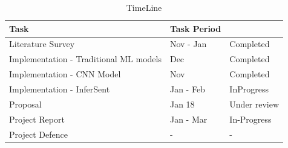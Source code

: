 \documentclass[12pt]{report} %
\begin{document}
	\begin{table}[ht]
		\centering
		\caption{TimeLine}
		\label{my-label}
		\begin{tabular}{|l|l|l|}
			\hline
			Task                          & Task Period &             \\
			\hline
			Literature Survey             & Nov - Jan   & Completed   \\
			\hline
			Implementation - Traditional ML models & Dec         & Completed   \\
			\hline
			Implementation - CNN Model   & Nov         & Completed   \\
			\hline
			Implementation - InferSent   & Jan - Feb   &  InProgress \\
			\hline
			Proposal                      & Jan 18        & Under review          \\
			\hline
			Project Report                & Jan - Mar   & In-Progress           \\
			\hline
			Project Defence               &       -      & - \\    
			\hline       
		\end{tabular}
	\end{table}
   

   
\end{document}
